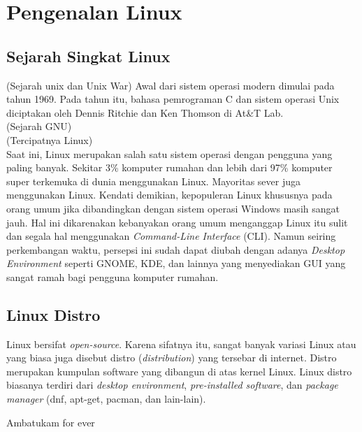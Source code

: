 \chapter{Pengenalan Linux}

\section{Sejarah Singkat Linux}
(Sejarah unix dan Unix War) Awal dari sistem operasi modern dimulai pada tahun 1969. Pada tahun itu, bahasa pemrograman C dan sistem operasi Unix diciptakan oleh Dennis Ritchie dan Ken Thomson di At\&T Lab. \\ 

(Sejarah GNU) \\ 

(Tercipatnya Linux) \\ 

Saat ini, Linux merupakan salah satu sistem operasi dengan pengguna yang paling banyak. Sekitar 3\% komputer rumahan dan lebih dari 97\% komputer super terkemuka di dunia menggunakan Linux. Mayoritas sever juga menggunakan Linux. Kendati demikian, kepopuleran Linux khususnya pada orang umum jika dibandingkan dengan sistem operasi Windows masih sangat jauh. Hal ini dikarenakan kebanyakan orang umum menganggap Linux itu sulit dan segala hal menggunakan \textit{Command-Line Interface} (CLI). Namun seiring perkembangan waktu, persepsi ini sudah dapat diubah dengan adanya \textit{Desktop Environment} seperti GNOME, KDE, dan lainnya yang menyediakan GUI yang sangat ramah bagi pengguna komputer rumahan.\\

\section{Linux Distro}
Linux bersifat \textit{open-source}. Karena sifatnya itu, sangat banyak variasi Linux atau yang biasa juga disebut distro (\textit{distribution}) yang tersebar di internet. Distro merupakan kumpulan software yang dibangun di atas kernel Linux. Linux distro biasanya terdiri dari \textit{desktop environment}, \textit{pre-installed software}, dan \textit{package manager} (dnf, apt-get, pacman, dan lain-lain).


Ambatukam for ever
